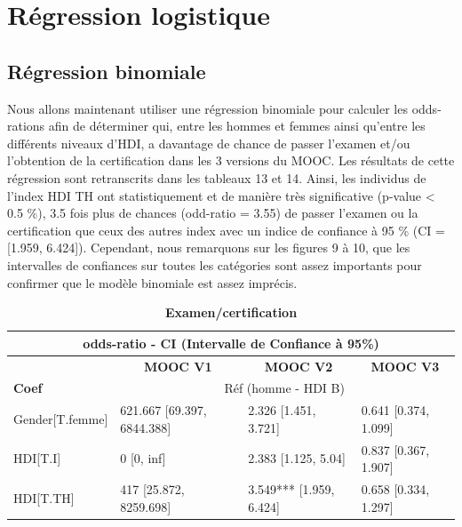 \documentclass[12pt, a4paper, titlepage, table]{article}
\begin{document}
\section{Régression logistique}
\subsection{Régression binomiale}
Nous allons maintenant utiliser une régression binomiale pour calculer les odds-rations afin de déterminer qui, entre les hommes et femmes ainsi qu'entre les
différents niveaux d'HDI, a davantage de chance de passer l'examen et/ou l'obtention de la certification dans les 3 versions du MOOC.
Les résultats de cette régression sont retranscrits dans les tableaux 13 et 14.
Ainsi, les individus de l'index HDI TH ont statistiquement et de manière très significative (p-value < 0.5 \%), 3.5 fois plus de chances (odd-ratio = 3.55) 
de passer l'examen ou la certification que ceux des autres index avec un indice de confiance à 95 \% (CI = [1.959, 6.424]).
Cependant, nous remarquons sur les figures 9 à 10, que les intervalles de confiances sur toutes les catégories sont assez importants pour confirmer
que le modèle binomiale est assez imprécis.


\begin{table}[H]
	\centering
	\fontsize{12}{20}\selectfont
	\begin{tabular}{|l|l|l|l|}
		\hline
		\multicolumn{4}{|c|}{\textbf{odds-ratio - CI (Intervalle de Confiance à 95\%)}}\\
		\hline
		\multicolumn{1}{|c|}{\textbf{}}&
		\multicolumn{1}{c|}{\textbf{MOOC V1}}&
		\multicolumn{1}{c|}{\textbf{MOOC V2}}&
		\multicolumn{1}{c|}{\textbf{MOOC V3}}\\
		\hline
		\textbf{Coef}&
		\multicolumn{3}{c|}{Réf (homme - HDI B)}\\
		\hline
		Gender[T.femme]&621.667 [69.397, 6844.388]&  2.326 [1.451, 3.721]& 0.641 [0.374, 1.099]\\
		HDI[T.I]&		0 [0, inf]&	2.383 [1.125, 5.04]& 0.837 [0.367, 1.907]\\ 
		HDI[T.TH]&		417 [25.872, 8259.698]&	3.549*** [1.959, 6.424]&  0.658 [0.334, 1.297]\\
		\hline
	\end{tabular}
	\caption{\textbf{Examen/certification}}
\end{table}
\end{document}

